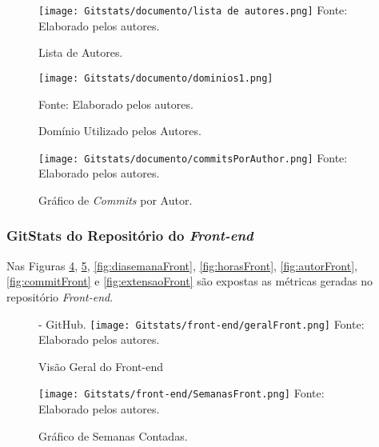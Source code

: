 \documentclass[
    12pt,               %
    openright,          %
    oneside,
    a4paper,            %
    BIBLATEX,           %
    TODO,               %
    english,            %
    brazil              %
    ]{ifsp-spo-inf-ctds}
\begin{document}
    \begin{figure}[H]
                \centering
                \caption{Lista de Autores.}
                \texttt{[image: Gitstats/documento/lista de autores.png]}
                {\footnotesize Fonte: Elaborado pelos autores.}
                \label{fig:listaautores}
            \end{figure}
            
    \begin{figure}[H]
            \centering
            \caption{Domínio Utilizado pelos Autores.}
            \texttt{[image: Gitstats/documento/dominios1.png]}
  
            {\footnotesize Fonte: Elaborado pelos autores.}
            \label{fig:dominio}
        \end{figure}  


    \begin{figure}[H]
            \centering
            \caption{Gráfico de \emph{Commits} por Autor.}
            \texttt{[image: Gitstats/documento/commitsPorAuthor.png]}
            {\footnotesize Fonte: Elaborado pelos autores.}
            \label{fig:commitautor}
    \end{figure} 



\subsubsection{GitStats do Repositório do \emph{Front-end}}
    Nas Figuras \ref{fig:geralFront}, \ref{fig:semanasFront}, \ref{fig:diasemanaFront}, \ref{fig:horasFront}, \ref{fig:autorFront}, \ref{fig:commitFront} e \ref{fig:extensaoFront} são expostas as métricas geradas no repositório \emph{Front-end}.

        \begin{figure}[H]
                \centering
                \caption{Visão Geral do Front-end} - GitHub.
                \texttt{[image: Gitstats/front-end/geralFront.png]}
                {\footnotesize Fonte: Elaborado pelos autores.}
                \label{fig:geralFront}
        \end{figure}     

        \begin{figure}[H]
                \centering
                \caption{Gráfico de Semanas Contadas.}
                \texttt{[image: Gitstats/front-end/SemanasFront.png]}
                {\footnotesize Fonte: Elaborado pelos autores.}
                \label{fig:semanasFront}
        \end{figure}    
\end{document}

